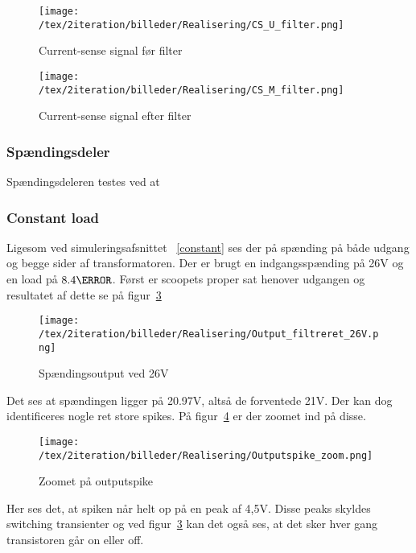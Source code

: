 \begin{figure}[H]
	\center
	\texttt{[image: /tex/2iteration/billeder/Realisering/CS\_U\_filter.png]}
	\caption{Current-sense signal før filter}
	\label{fig:CS_U_filter}
\end{figure}

\begin{figure}[H]
	\center
	\texttt{[image: /tex/2iteration/billeder/Realisering/CS\_M\_filter.png]}
	\caption{Current-sense signal efter filter}
	\label{fig:CS_M_filter}
\end{figure}


\subsubsection{Spændingsdeler}
Spændingsdeleren testes ved at 

\subsubsection{Constant load}
Ligesom ved simuleringsafsnittet ~\ref{constant} ses der på spænding på både udgang og begge sider af transformatoren. Der er brugt en indgangsspænding på 26V og en load på $8.4\ohm$. 
Først er scoopets proper sat henover udgangen og resultatet af dette se på figur~\ref{fig: Out26V}
\begin{figure}[H]
	\center
	\texttt{[image: /tex/2iteration/billeder/Realisering/Output\_filtreret\_26V.png]}
	\caption{Spændingsoutput ved 26V}
	\label{fig: Out26V}
\end{figure}
Det ses at spændingen ligger på 20.97V, altså de forventede 21V. Der kan dog identificeres nogle ret store spikes. På figur~\ref{fig: Out26Vzoom} er der zoomet ind på disse.
\begin{figure}[H]
	\center
	\texttt{[image: /tex/2iteration/billeder/Realisering/Outputspike\_zoom.png]}
	\caption{Zoomet på outputspike}
	\label{fig: Out26Vzoom}
\end{figure}
Her ses det, at spiken når helt op på en peak af 4,5V. Disse peaks skyldes switching transienter og ved figur~\ref{fig: Out26V} kan det også ses, at det sker hver gang transistoren går on eller off.

